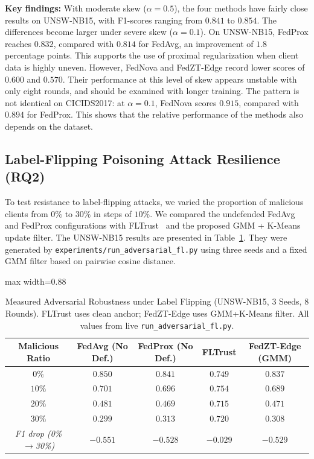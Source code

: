 \documentclass[11pt,a4paper]{article}
\begin{document}
\textbf{Key findings:} With moderate skew ($\alpha=0.5$), the four methods have fairly close results on UNSW-NB15, with F1-scores ranging from $0.841$ to $0.854$. The differences become larger under severe skew ($\alpha=0.1$). On UNSW-NB15, FedProx reaches $0.832$, compared with $0.814$ for FedAvg, an improvement of $1.8$ percentage points. This supports the use of proximal regularization when client data is highly uneven. However, FedNova and FedZT-Edge record lower scores of $0.600$ and $0.570$. Their performance at this level of skew appears unstable with only eight rounds, and should be examined with longer training. The pattern is not identical on CICIDS2017: at $\alpha=0.1$, FedNova scores $0.915$, compared with $0.894$ for FedProx. This shows that the relative performance of the methods also depends on the dataset.

\subsection{Label-Flipping Poisoning Attack Resilience (RQ2)}
To test resistance to label-flipping attacks, we varied the proportion of malicious clients from $0\%$ to $30\%$ in steps of $10\%$. We compared the undefended FedAvg and FedProx configurations with FLTrust~\cite{cao2021fltrust} and the proposed GMM + K-Means update filter. The UNSW-NB15 results are presented in Table~\ref{tab:adversarial_results}. They were generated by \texttt{experiments/run\_adversarial\_fl.py} using three seeds and a fixed GMM filter based on pairwise cosine distance.

\begin{table}[htbp]
\centering
\caption{Measured Adversarial Robustness under Label Flipping (UNSW-NB15, 3 Seeds, 8 Rounds). FLTrust uses clean anchor; FedZT-Edge uses GMM+K-Means filter. All values from live \texttt{run\_adversarial\_fl.py}.}
\label{tab:adversarial_results}
\footnotesize
\begin{adjustbox}{max width=0.88\textwidth}
\begin{tabular}{ccccc}
\toprule
\textbf{Malicious Ratio} & \textbf{FedAvg (No Def.)} & \textbf{FedProx (No Def.)} & \textbf{FLTrust} & \textbf{FedZT-Edge (GMM)} \\
\midrule
$0\%$  & $0.850$ & $0.841$ & $0.749$ & $0.837$ \\
$10\%$ & $0.701$ & $0.696$ & $0.754$ & $0.689$ \\
$20\%$ & $0.481$ & $0.469$ & $0.715$ & $0.471$ \\
$30\%$ & $0.299$ & $0.313$ & $0.720$ & $0.308$ \\
\addlinespace[4pt]
\textit{F1 drop (0\%$\to$30\%)} & $\mathit{-0.551}$ & $\mathit{-0.528}$ & $\mathit{-0.029}$ & $\mathit{-0.529}$ \\
\bottomrule
\end{tabular}
\end{adjustbox}
\end{table}
\FloatBarrier
\end{document}
